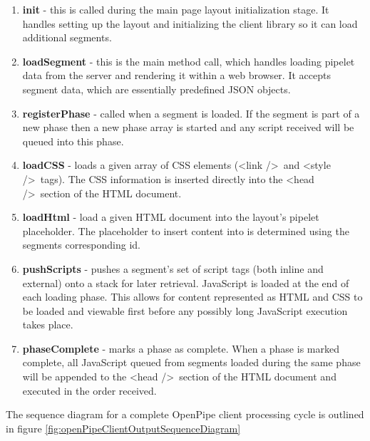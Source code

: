 \documentclass[12pt]{report}
\begin{document}
\begin{enumerate}
\item \textbf{init} - this is called during the main page layout initialization stage. It handles setting up the layout and initializing the client library so it can load additional segments.
\item \textbf{loadSegment} - this is the main method call, which handles loading pipelet data from the server and rendering it within a web browser. It accepts segment data, which are essentially predefined JSON objects.
\item \textbf{registerPhase} - called when a segment is loaded. If the segment is part of a new phase then a new phase array is started and any script received will be queued into this phase.
\item \textbf{loadCSS} - loads a given array of CSS elements (\textless link /\textgreater\ and \textless style /\textgreater\ tags). The CSS information is inserted directly into the \textless head /\textgreater\ section of the HTML document.
\item \textbf{loadHtml} - load a given HTML document into the layout’s pipelet placeholder. The placeholder to insert content into is determined using the segments corresponding id.
\item \textbf{pushScripts} - pushes a segment's set of script tags (both inline and external) onto a stack for later retrieval. JavaScript is loaded at the end of each loading phase. This allows for content represented as HTML and CSS to be loaded and viewable first before any possibly long JavaScript execution takes place.
\item \textbf{phaseComplete} - marks a phase as complete. When a phase is marked complete, all JavaScript queued from segments loaded during the same phase will be appended to the \textless head /\textgreater\ section of the HTML document and executed in the order received.
\end{enumerate}

The sequence diagram for a complete OpenPipe client processing cycle is outlined in figure \ref{fig:openPipeClientOutputSequenceDiagram}
\end{document}
